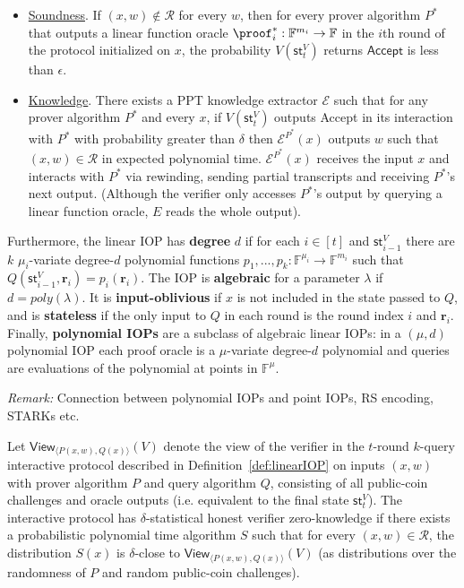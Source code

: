 \begin{definition} 
\begin{itemize}
\item \underline{Soundness}. If $(x, w) \notin \mathcal{R}$ for every $w$, then for every prover algorithm $P^*$ that outputs a linear function oracle $\proof^*_i: \mathbb{F}^{m_i} \rightarrow \mathbb{F}$ in the $i$th round of the protocol initialized on $x$, the probability $V(\textsf{st}^V_t)$ returns $\textsf{Accept}$ is less than $\epsilon$. 

\item \underline{Knowledge}. There exists a PPT knowledge extractor $\mathcal{E}$ such that for any prover algorithm $P^*$ and every $x$, if $V(\textsf{st}^V_t)$ outputs \textsf{Accept} in its interaction with $P^*$ with probability greater than $\delta$ then $\mathcal{E}^{P^*}(x)$ outputs $w$ such that $(x, w) \in \mathcal{R}$ in expected polynomial time. $\mathcal{E}^{P^*}(x)$ receives the input $x$ and interacts with $P^*$ via rewinding, sending partial transcripts and receiving $P^*$'s next output. (Although the verifier only accesses $P^*$'s output by querying a linear function oracle, $E$ reads the whole output). 

\end{itemize}

Furthermore, the linear IOP has \textbf{degree} $d$ if for each $i \in [t]$ and $\textsf{st}^V_{i-1}$ there are $k$ $\mu_i$-variate degree-$d$ polynomial functions $p_1,...,p_k: \mathbb{F}^{\mu_i} \rightarrow \mathbb{F}^{m_i}$ such that $Q(\textsf{st}^V_{i-1}, \mathbf{r}_i) = p_i(\mathbf{r}_i)$. The IOP is \textbf{algebraic} for a parameter $\lambda$ if $d = poly(\lambda)$. 
It is \textbf{input-oblivious} if $x$ is not included in the state passed to $Q$, and is \textbf{stateless} if the only input to $Q$ in each round is the round index $i$ and $\mathbf{r}_i$.
Finally, \textbf{polynomial IOPs} are a subclass of algebraic linear IOPs: in a $(\mu, d)$ polynomial IOP each proof oracle is a $\mu$-variate degree-$d$ polynomial and queries are evaluations of the polynomial at points in $\mathbb{F}^\mu$. 
\end{definition} 

\emph{Remark:} Connection between polynomial IOPs and point IOPs, RS encoding, STARKs etc. 

\begin{definition}
Let $\textsf{View}_{\langle P(x, w), Q(x) \rangle}(V)$ denote the view of the verifier in the $t$-round $k$-query interactive protocol described in Definition~\ref{def:linearIOP} on inputs $(x,w)$ with prover algorithm $P$ and query algorithm $Q$, consisting of all public-coin challenges and oracle outputs (i.e. equivalent to the final state $\textsf{st}^V_t$). The interactive protocol has $\delta$-statistical honest verifier zero-knowledge if there exists a probabilistic polynomial time algorithm $S$ such that for every $(x, w) \in \mathcal{R}$, the distribution $S(x)$ is $\delta$-close to $\textsf{View}_{\langle P(x, w), Q(x) \rangle}(V)$ (as distributions over the randomness of $P$ and random public-coin challenges).
\end{definition}

